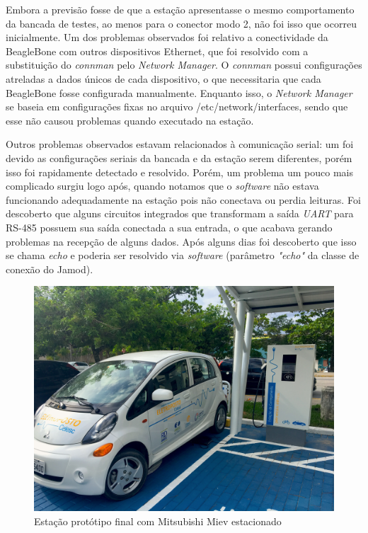     Embora a previsão fosse de que a estação apresentasse o mesmo comportamento da bancada de testes, ao menos para o conector modo 2, não foi isso que ocorreu inicialmente. Um dos problemas observados foi relativo a conectividade da BeagleBone com outros dispositivos Ethernet, que foi resolvido com a substituição do \textit{connman} pelo \textit{Network Manager}. O \textit{connman} possui configurações atreladas a dados únicos de cada dispositivo, o que necessitaria que cada BeagleBone fosse configurada manualmente. Enquanto isso, o \textit{Network Manager} se baseia em configurações fixas no arquivo /etc/network/interfaces, sendo que esse não causou problemas quando executado na estação.

    Outros problemas observados estavam relacionados à comunicação serial: um foi devido as configurações seriais da bancada e da estação serem diferentes, porém isso foi rapidamente detectado e resolvido. Porém, um problema um pouco mais complicado surgiu logo após, quando notamos que o \textit{software} não estava funcionando adequadamente na estação pois não conectava ou perdia leituras. Foi descoberto que alguns circuitos integrados que transformam a saída \textit{\ac{UART}} para RS-485 possuem sua saída conectada a sua entrada, o que acabava gerando problemas na recepção de alguns dados. Após alguns dias foi descoberto que isso se chama \textit{echo} e poderia ser resolvido via \textit{software} (parâmetro \textit{"echo"} da classe de conexão do Jamod).

    \begin{figure}[H]
      \begin{center}
        \includegraphics[width=.75\textwidth,natwidth=4032,natheight=3024]{assets/images/evse.jpg}
        \caption{Estação protótipo final com Mitsubishi Miev estacionado}
        \label{fig:evse}
      \end{center}
    \end{figure}

